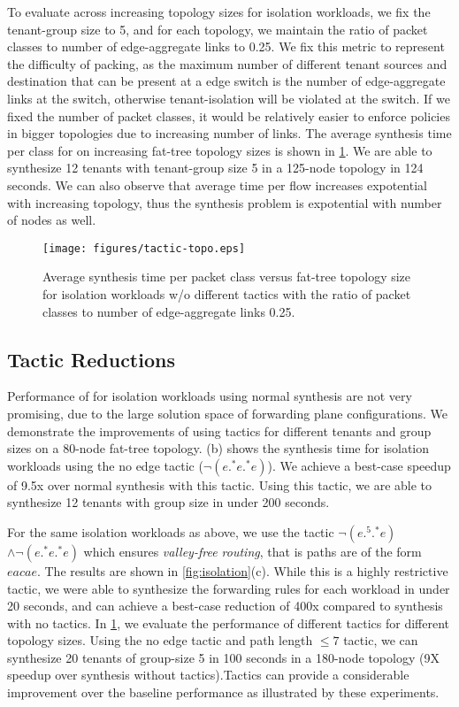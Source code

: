 To evaluate \Name across increasing topology sizes for isolation workloads, 
we fix the tenant-group size to 5, and for each topology, we maintain
 the ratio of packet classes to number of edge-aggregate links to 0.25. 
 We fix this metric to represent the difficulty of packing, as the maximum number 
 of different tenant sources and destination that can be present at a edge switch
 is the number of edge-aggregate links at the switch, otherwise tenant-isolation
 will be violated at the switch. If we fixed the number of packet classes, it would 
 be relatively easier to enforce policies in bigger topologies due to increasing 
 number of links. The average synthesis time per class for
 on increasing fat-tree topology sizes is shown in \cref{fig:tactic-topo}. 
 We are able to synthesize 12 tenants with tenant-group size 5 in a 125-node topology in 124 seconds. 
  We can also observe that average time per flow increases expotential 
  with increasing topology, thus the synthesis problem is expotential with number of nodes as well. 
\begin{figure}[H]
	\texttt{[image: figures/tactic-topo.eps]}
	\caption{Average synthesis time per packet class versus fat-tree topology size for isolation workloads 
		w/o different tactics with the ratio of packet classes to number of edge-aggregate links 0.25.}
	\label{fig:tactic-topo}
\end{figure}

\subsection{Tactic Reductions}
Performance of \Name for isolation workloads using normal synthesis are not 
very promising, due to the large solution space of forwarding plane configurations. We 
demonstrate the improvements of using tactics for different tenants and group sizes on a 
80-node fat-tree topology.
(b) shows the synthesis time for isolation workloads using the no edge tactic 
($\neg(e .^* e .^* e)$). We achieve a best-case speedup of 9.5x over normal synthesis with this tactic. 
Using this tactic, we are able to synthesize 12 tenants with group size in under 200
seconds.

For the same isolation workloads as above, we use the tactic $\neg (e .^5 .^* e)$ $\wedge \neg (e .^* e .^* e)$
which ensures {\em valley-free routing}, that is paths are of the form $eacae$. 
The results are shown in \cref{fig:isolation}(c). 
While this is a highly
restrictive tactic, we were able to synthesize the forwarding rules for each workload in under 20 seconds, 
and can achieve a best-case reduction of 400x compared to synthesis with no tactics. In \cref{fig:tactic-topo},
we evaluate the performance of different tactics for different topology sizes. Using the no edge tactic
and path length $\leq 7$ tactic, we can synthesize 20 tenants of group-size 5 in 100 seconds in a 180-node
topology (9X speedup over synthesis without tactics).Tactics can provide 
a considerable improvement over the baseline performance as illustrated by these experiments. 

